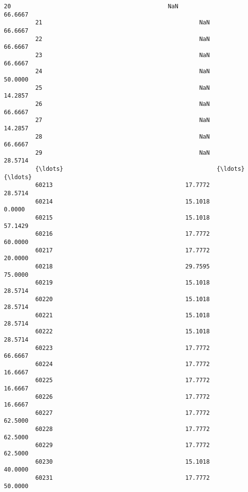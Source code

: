 \documentclass[11pt]{article}
\begin{document}
\begin{Verbatim}[commandchars=\\\{\}]
         20                                             NaN                 66.6667   
         21                                             NaN                 66.6667   
         22                                             NaN                 66.6667   
         23                                             NaN                 66.6667   
         24                                             NaN                 50.0000   
         25                                             NaN                 14.2857   
         26                                             NaN                 66.6667   
         27                                             NaN                 14.2857   
         28                                             NaN                 66.6667   
         29                                             NaN                 28.5714   
         {\ldots}                                            {\ldots}                     {\ldots}   
         60213                                      17.7772                 28.5714   
         60214                                      15.1018                  0.0000   
         60215                                      15.1018                 57.1429   
         60216                                      17.7772                 60.0000   
         60217                                      17.7772                 20.0000   
         60218                                      29.7595                 75.0000   
         60219                                      15.1018                 28.5714   
         60220                                      15.1018                 28.5714   
         60221                                      15.1018                 28.5714   
         60222                                      15.1018                 28.5714   
         60223                                      17.7772                 66.6667   
         60224                                      17.7772                 16.6667   
         60225                                      17.7772                 16.6667   
         60226                                      17.7772                 16.6667   
         60227                                      17.7772                 62.5000   
         60228                                      17.7772                 62.5000   
         60229                                      17.7772                 62.5000   
         60230                                      15.1018                 40.0000   
         60231                                      17.7772                 50.0000   

\end{Verbatim}
\end{document}
